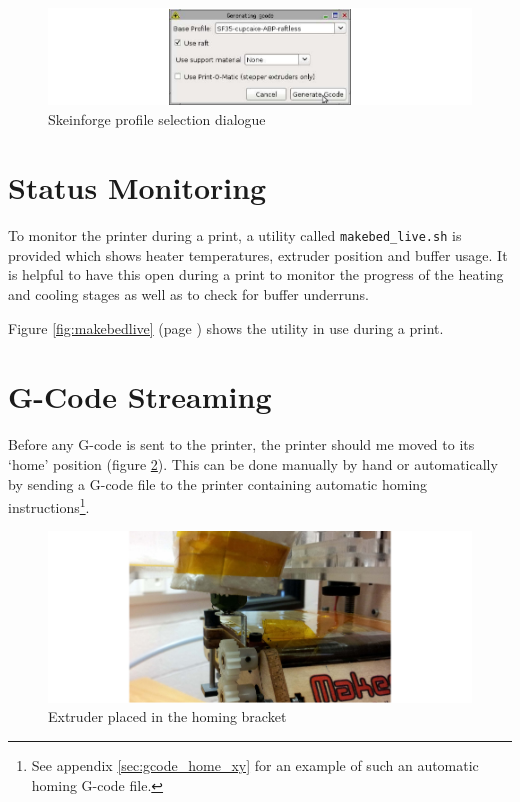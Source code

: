 		\begin{figure}
			\includegraphics[width=1\textwidth]{diagrams/skeinforge.pdf}
			\caption{Skeinforge profile selection dialogue}
			\label{fig:skeinforge}
		\end{figure}
	
	\section{Status Monitoring}
		
		To monitor the printer during a print, a utility called
		\verb|makebed_live.sh| is provided which shows heater temperatures, extruder
		position and buffer usage. It is helpful to have this open during a print to
		monitor the progress of the heating and cooling stages as well as to check
		for buffer underruns.
		
		Figure \ref{fig:makebedlive} (page \pageref{fig:makebedlive}) shows the
		utility in use during a print.
		
	\section{G-Code Streaming}
		
		Before any G-code is sent to the printer, the printer should me moved to its
		`home' position (figure \ref{fig:homing}). This can be done manually by hand
		or automatically by sending a G-code file to the printer containing
		automatic homing instructions\footnote{See appendix \ref{sec:gcode_home_xy}
		for an example of such an automatic homing G-code file.}.
		
		\begin{figure}
			\includegraphics[width=1\textwidth]{diagrams/homing.pdf}
			\caption{Extruder placed in the homing bracket}
			\label{fig:homing}
		\end{figure}
		

